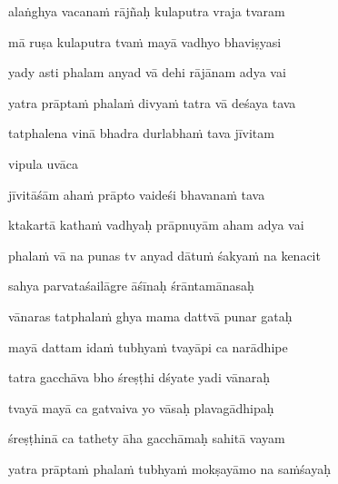 alaṅghya vacana\.m rājñaḥ kulaputra vraja tvaram \veg\dontdisplaylinenum

mā ruṣa kulaputra tva\.m mayā vadhyo bhaviṣyasi\thinspace{\dandab} \dontdisplaylinenum

yady asti phalam anyad vā dehi rājānam adya vai \veg\dontdisplaylinenum

yatra prāpta\.m phala\.m divya\.m tatra vā deśaya tava\thinspace{\dandab} \dontdisplaylinenum

tatphalena vinā bhadra durlabha\.m tava jīvitam \veg\dontdisplaylinenum

vipula uvāca~{\dandab}\dontdisplaylinenum 

jīvitāśām aha\.m prāpto vaideśi bhavana\.m tava\thinspace{\danda} \dontdisplaylinenum

ktakartā katha\.m vadhyaḥ prāpnuyām aham adya vai \veg\dontdisplaylinenum

phala\.m vā na punas tv anyad dātu\.m śakya\.m na kenacit\thinspace{\dandab} \dontdisplaylinenum

sahya parvataśailāgre āśīnaḥ śrāntamānasaḥ \veg\dontdisplaylinenum

vānaras tatphala\.m ghya mama dattvā punar gataḥ\thinspace{\dandab} \dontdisplaylinenum

mayā dattam ida\.m tubhya\.m tvayāpi ca narādhipe \veg\dontdisplaylinenum

tatra gacchāva bho śreṣṭhi dśyate yadi vānaraḥ\thinspace{\dandab} \dontdisplaylinenum

tvayā mayā ca gatvaiva yo vāsaḥ plavagādhipaḥ \veg\dontdisplaylinenum

śreṣṭhinā ca tathety āha gacchāmaḥ sahitā vayam\thinspace{\dandab} \dontdisplaylinenum

yatra prāpta\.m phala\.m tubhya\.m mokṣayāmo na sa\.mśayaḥ \veg\dontdisplaylinenum

